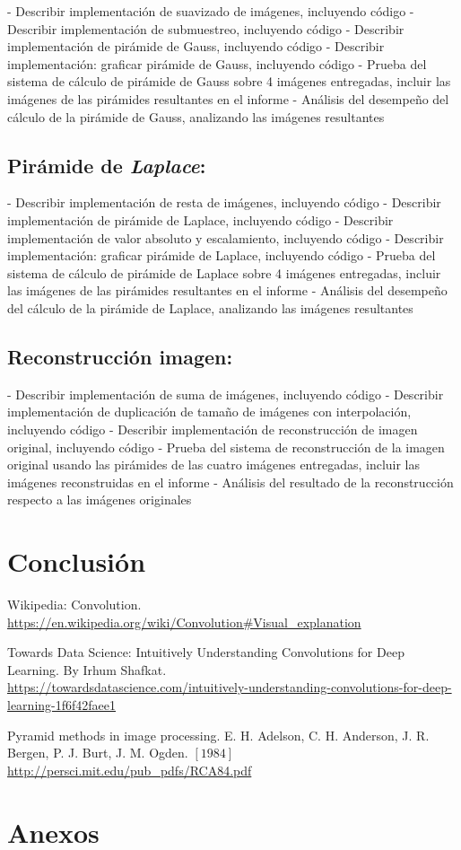 \documentclass[12pt, letterpaper]{article}
\begin{document}
\newpage
- Describir implementación de suavizado de imágenes, incluyendo código
- Describir implementación de submuestreo, incluyendo código
- Describir implementación de pirámide de Gauss, incluyendo código
- Describir implementación: graficar pirámide de Gauss, incluyendo código
- Prueba del sistema de cálculo de pirámide de Gauss sobre 4 imágenes entregadas, incluir las
imágenes de las pirámides resultantes en el informe
- Análisis del desempeño del cálculo de la pirámide de Gauss, analizando las imágenes resultantes


\subsection{Pirámide de \textit{Laplace}:}
- Describir implementación de resta de imágenes, incluyendo código
- Describir implementación de pirámide de Laplace, incluyendo código
- Describir implementación de valor absoluto y escalamiento, incluyendo código
- Describir implementación: graficar pirámide de Laplace, incluyendo código
- Prueba del sistema de cálculo de pirámide de Laplace sobre 4 imágenes entregadas, incluir las
imágenes de las pirámides resultantes en el informe
- Análisis del desempeño del cálculo de la pirámide de Laplace, analizando las imágenes resultantes


\subsection{Reconstrucción imagen:}
- Describir implementación de suma de imágenes, incluyendo código
- Describir implementación de duplicación de tamaño de imágenes con interpolación, incluyendo
código
- Describir implementación de reconstrucción de imagen original, incluyendo código
- Prueba del sistema de reconstrucción de la imagen original usando las pirámides de las cuatro
imágenes entregadas, incluir las imágenes reconstruidas en el informe
- Análisis del resultado de la reconstrucción respecto a las imágenes originales


\section{Conclusión}


\newpage
\begin{thebibliography}{X}
     Wikipedia: Convolution. \\
    \url{https://en.wikipedia.org/wiki/Convolution#Visual_explanation} 

     Towards Data Science: Intuitively Understanding Convolutions for Deep Learning. By Irhum Shafkat. \\
    \url{https://towardsdatascience.com/intuitively-understanding-convolutions-for-deep-learning-1f6f42faee1} 

     Pyramid methods in image processing. E. H. Adelson, C. H. Anderson,  J. R. Bergen,  P. J. Burt,  J. M. Ogden. $[1984]$
    \url{http://persci.mit.edu/pub_pdfs/RCA84.pdf}

\end{thebibliography}

\section{Anexos}
\end{document}
